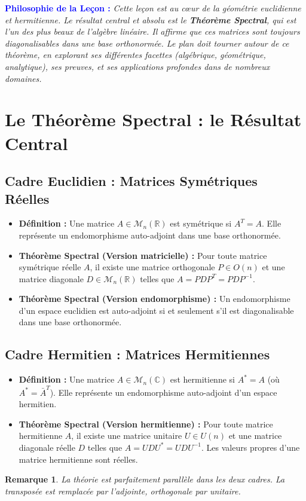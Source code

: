 \documentclass[12pt, a4paper, parskip=full]{report}
\theoremstyle{agregstyle}
\newtheorem{remark}[definition]{Remarque}
\newenvironment{philosophie}
  {\par\medskip\noindent\begin{oframed}\noindent\textbf{\textcolor{blue}{Philosophie de la Leçon :}}\itshape}
  {\end{oframed}\par\medskip}
\begin{document}
\begin{philosophie}
    Cette leçon est au cœur de la géométrie euclidienne et hermitienne. Le résultat central et absolu est le \textbf{Théorème Spectral}, qui est l'un des plus beaux de l'algèbre linéaire. Il affirme que ces matrices sont toujours diagonalisables dans une base orthonormée. Le plan doit tourner autour de ce théorème, en explorant ses différentes facettes (algébrique, géométrique, analytique), ses preuves, et ses applications profondes dans de nombreux domaines.
\end{philosophie}

\section{Le Théorème Spectral : le Résultat Central}

\subsection{Cadre Euclidien : Matrices Symétriques Réelles}
\begin{itemize}
    \item \textbf{Définition :} Une matrice $A \in \mathcal{M}_n(\mathbb{R})$ est symétrique si $A^T=A$. Elle représente un endomorphisme auto-adjoint dans une base orthonormée.
    \item \textbf{Théorème Spectral (Version matricielle) :} Pour toute matrice symétrique réelle $A$, il existe une matrice orthogonale $P \in O(n)$ et une matrice diagonale $D \in \mathcal{M}_n(\mathbb{R})$ telles que $A = PDP^T = PDP^{-1}$.
    \item \textbf{Théorème Spectral (Version endomorphisme) :} Un endomorphisme d'un espace euclidien est auto-adjoint si et seulement s'il est diagonalisable dans une base orthonormée.
\end{itemize}

\subsection{Cadre Hermitien : Matrices Hermitiennes}
\begin{itemize}
    \item \textbf{Définition :} Une matrice $A \in \mathcal{M}_n(\mathbb{C})$ est hermitienne si $A^*=A$ (où $A^*=\bar{A}^T$). Elle représente un endomorphisme auto-adjoint d'un espace hermitien.
    \item \textbf{Théorème Spectral (Version hermitienne) :} Pour toute matrice hermitienne $A$, il existe une matrice unitaire $U \in U(n)$ et une matrice diagonale réelle $D$ telles que $A = UDU^* = UDU^{-1}$. Les valeurs propres d'une matrice hermitienne sont réelles.
\end{itemize}
\begin{remark}
    La théorie est parfaitement parallèle dans les deux cadres. La transposée est remplacée par l'adjointe, orthogonale par unitaire.
\end{remark}
\end{document}

